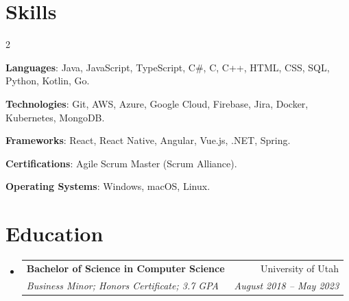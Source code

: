 \documentclass[letterpaper,11pt]{article}
\makeatletter
\newcommand{\resumeSubheading}[4]{
  \vspace{-1pt}\item
    \begin{tabular*}{0.97\textwidth}{l@{\extracolsep{\fill}}r}
      \textbf{#1} & #2 \\
      \textit{\small#3} & \textit{\small #4} \\
    \end{tabular*}\vspace{-5pt}
}
\newcommand{\resumeSubHeadingListStart}{\begin{itemize}[leftmargin=*]}
\newcommand{\resumeSubHeadingListEnd}{\end{itemize}}
\makeatother
\begin{document}
\section{Skills}
\vspace{-15pt}
\begin{multicols}{2}
    \begin{samepage}
     \textbf{Languages}{: Java, JavaScript, TypeScript, C\#, C, C++, HTML, CSS, SQL, Python, Kotlin, Go. }\par
  \end{samepage}
  \begin{samepage}
     \textbf{Technologies}{: Git, AWS, Azure, Google Cloud, Firebase, Jira, Docker, Kubernetes, MongoDB.}\par
  \end{samepage}
  \begin{samepage}
     \textbf{Frameworks}{: React, React Native, Angular, Vue.js, .NET, Spring.}\par
  \end{samepage}
  \begin{samepage}
     \textbf{Certifications}{: Agile Scrum Master (Scrum Alliance).}\par
  \end{samepage}
  \begin{samepage}
     \textbf{Operating Systems}{: Windows, macOS, Linux.}\par
  \end{samepage}
 \end{multicols}

\section{Education}
  \resumeSubHeadingListStart
    \resumeSubheading
      {Bachelor of Science in Computer Science}{University of Utah}
      {Business Minor; Honors Certificate; 3.7 GPA}{August 2018 -- May 2023}
  \resumeSubHeadingListEnd

\end{document}

